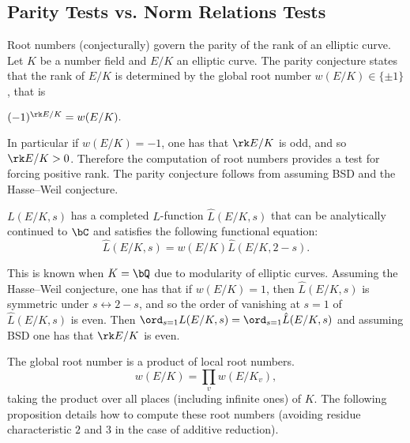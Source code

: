 \subsection{Parity Tests vs. Norm Relations Tests}
Root numbers (conjecturally) govern the parity of the rank of an elliptic curve. Let $K$ be a number field and $E / K$ an elliptic curve. The parity conjecture states that the rank of $E / K$ is determined by the global root number $w(E / K) \in \{ \pm 1 \}$, that is

\begin{conj}\label{parity}
    $(-1)^{\rk E / K} = w(E / K).$
\end{conj}

In particular if $w(E / K) = -1$, one has that $\rk E / K$ is odd, and so $\rk E / K > 0$. Therefore the computation of root numbers provides a test for forcing positive rank. The parity conjecture follows from assuming BSD and the Hasse--Weil conjecture. 

\begin{conj}
    $L(E / K, s)$ has a completed $L$-function 
    $\hat{L}(E / K, s)$ that can be analytically continued to $\bC$ and satisfies the following functional equation:
    \[ \hat{L}(E / K, s) = w(E / K) \hat{L}(E / K, 2- s) .\]
\end{conj}

This is known when $K = \bQ$ due to modularity of elliptic curves. Assuming the Hasse--Weil conjecture, one has that if $w(E / K) = 1$, then $\hat{L}(E / K, s)$ is symmetric under $s \leftrightarrow 2 - s$, and so the order of vanishing at $s = 1$ of $\hat{L}(E / K, s)$ is even. Then $\ord_{s = 1} L(E / K, s) = \ord_{s = 1}\hat{L}(E / K, s)$ and assuming BSD one has that $\rk E / K$ is even. 

The global root number is a product of local root numbers. 
\[ w(E / K) = \prod_v w(E / K_v), \]
taking the product over all places (including infinite ones) of $K$. 
The following proposition details how to compute these root numbers (avoiding residue characteristic $2$ and $3$ in the case of additive reduction). 

